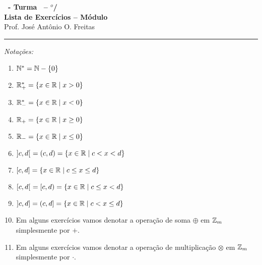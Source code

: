 \documentclass[12pt]{exam}
\begin{document}
    \begin{center}
    {\Large\bf \disciplina\ - Turma \turma\ -- \semestre$^{o}$/\ano} \\ \vspace{9pt} {\large\bf
        Lista de Exercícios -- Módulo \numeromodulo}\\ \vspace{9pt} Prof. José Antônio O. Freitas
    \end{center}

    \hrule

    \vspace{.6cm}

    \begin{center}
        \textit{Notações:}
    \end{center}
    \begin{multicols}{2}
        \begin{enumerate}[label={\roman*})]
            \item $\mathbb{N}^* = \mathbb{N} - \{0\}$

            \item $\mathbb{R}^*_+ = \{x \in \mathbb{R} \mid x > 0\}$

            \item $\mathbb{R}^*_- = \{x \in \mathbb{R} \mid x < 0\}$

            \item $\mathbb{R}_+ = \{x \in \mathbb{R} \mid x \ge 0\}$

            \item $\mathbb{R}_- = \{x \in \mathbb{R} \mid x \le 0\}$

            \item $]c,d[\ = (c,d) = \{x \in \mathbb{R} \mid c < x < d\}$

            \item $[c,d] = \{x \in \mathbb{R} \mid c \le x \le d\}$

            \item $[c,d[\ = [c, d) = \{x \in \mathbb{R} \mid c \le x < d\}$

            \item $]c,d] = (c, d] = \{x \in \mathbb{R} \mid c < x \le d\}$

            \item Em alguns exercícios vamos denotar a operação de soma $\oplus$ em $\mathbb{Z}_m$ simplesmente por $+$.

            \item Em alguns exercícios vamos denotar a operação de multiplicação $\otimes$ em $\mathbb{Z}_m$ simplesmente por $\cdot$.

        \end{enumerate}
    \end{multicols}
\end{document}
